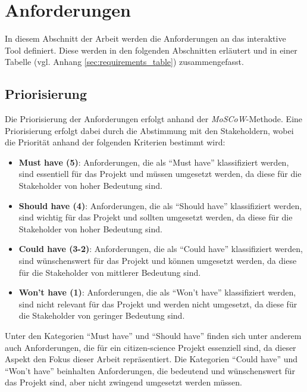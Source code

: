 \section{Anforderungen}
In diesem Abschnitt der Arbeit werden die Anforderungen an das interaktive Tool definiert. Diese werden in den folgenden Abschnitten erläutert und in einer Tabelle (vgl. Anhang \ref{sec:requirements_table}) zusammengefasst.

\subsection{Priorisierung}
Die Priorisierung der Anforderungen erfolgt anhand der \textit{MoSCoW}-Methode. Eine Priorisierung erfolgt dabei durch die Abstimmung mit den Stakeholdern, wobei die Priorität anhand der folgenden Kriterien bestimmt wird:

\begin{itemize}
    \item \textbf{Must have (5)}: Anforderungen, die als \enquote{Must have} klassifiziert werden, sind essentiell für das Projekt und müssen umgesetzt werden, da diese für die Stakeholder von hoher Bedeutung sind.
    \item \textbf{Should have (4)}: Anforderungen, die als \enquote{Should have} klassifiziert werden, sind wichtig für das Projekt und sollten umgesetzt werden, da diese für die Stakeholder von hoher Bedeutung sind.
    \item \textbf{Could have (3-2)}: Anforderungen, die als \enquote{Could have} klassifiziert werden, sind wünschenswert für das Projekt und können umgesetzt werden, da diese für die Stakeholder von mittlerer Bedeutung sind.
    \item \textbf{Won't have (1)}: Anforderungen, die als \enquote{Won't have} klassifiziert werden, sind nicht relevant für das Projekt und werden nicht umgesetzt, da diese für die Stakeholder von geringer Bedeutung sind.
\end{itemize}

Unter den Kategorien \enquote{Must have} und \enquote{Should have} finden sich unter anderem auch Anforderungen, die für ein citizen-science Projekt essenziell sind, da dieser Aspekt den Fokus dieser Arbeit repräsentiert. Die Kategorien \enquote{Could have} und \enquote{Won't have} beinhalten Anforderungen, die bedeutend und wünschenswert für das Projekt sind, aber nicht zwingend umgesetzt werden müssen. 

